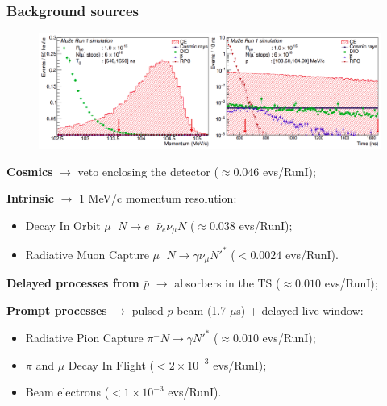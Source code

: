 \documentclass{beamer}
\begin{document}
\begin{frame}
    \frametitle{Background sources}
            \vspace{-3mm} 

         \begin{figure}[h]
            \centering
            \hspace*{-4ex}
            \includegraphics[width=1.\framewidth]{figures/png/Screenshot_20240225_102708.png}
        \end{figure}
        \setlength{\leftmargini}{-0.5em}
        \vspace{-3mm} 
      
    \begin{itemize}
      {\small
    \item \textbf{Cosmics} $\rightarrow$ veto enclosing the detector {\footnotesize($\approx$0.046 evs/RunI)};   
\item \textbf{Intrinsic} $\rightarrow$ 1 MeV/c momentum resolution:
\begin{itemize}
 \item Decay In Orbit $\mu^- N \rightarrow e^- \bar{\nu}_e\nu_\mu N $ {\footnotesize($\approx$0.038 evs/RunI)};
 \item Radiative Muon Capture $\mu^- N \rightarrow\gamma \nu_\mu N'^* $ {\footnotesize($<0.0024$ evs/RunI)}.
\end{itemize}
\item \textbf{Delayed processes from $\bar{p}$} $\rightarrow$ absorbers in the TS {\footnotesize($\approx0.010$ evs/RunI)};
\item \textbf{Prompt processes} $\rightarrow$ pulsed $p$ beam (1.7 $\mu$s) + delayed
live window:
\begin{itemize}
    \item Radiative Pion Capture $\pi^- N \rightarrow \gamma N' ^*$ {\footnotesize($\approx0.010$ evs/RunI)};
 \item $\pi$ and $\mu$ Decay In Flight {\footnotesize($<2\times 10^{-3}$ evs/RunI)};
 \item Beam electrons {\footnotesize($<1\times 10^{-3}$ evs/RunI)}.
     \end{itemize}
       }
      \end{itemize}
\end{frame}
\end{document}
